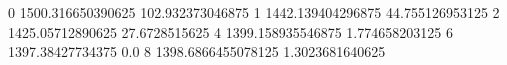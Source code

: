 0 1500.316650390625 102.932373046875
1 1442.139404296875 44.755126953125
2 1425.05712890625 27.6728515625
4 1399.158935546875 1.774658203125
6 1397.38427734375 0.0
8 1398.6866455078125 1.3023681640625
